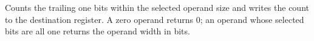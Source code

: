 Counts the trailing one bits within the selected operand size and writes the count to the destination register. A zero operand returns 0; an operand whose selected bits are all one returns the operand width in bits.
